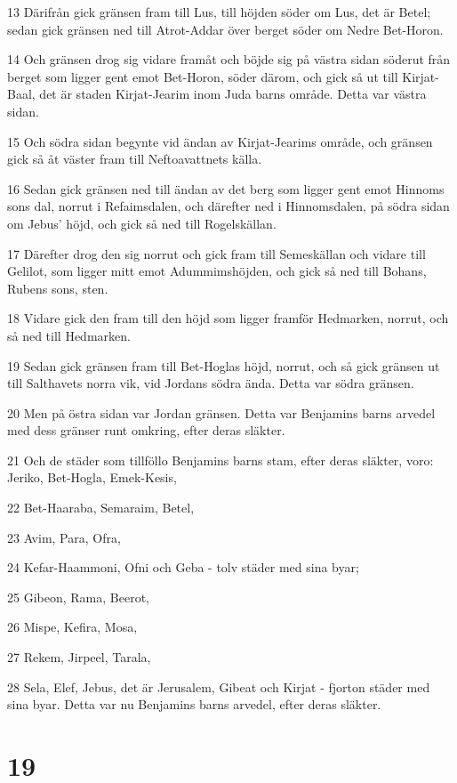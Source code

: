 \par 13 Därifrån gick gränsen fram till Lus, till höjden söder om Lus, det är Betel; sedan gick gränsen ned till Atrot-Addar över berget söder om Nedre Bet-Horon.
\par 14 Och gränsen drog sig vidare framåt och böjde sig på västra sidan söderut från berget som ligger gent emot Bet-Horon, söder därom, och gick så ut till Kirjat-Baal, det är staden Kirjat-Jearim inom Juda barns område. Detta var västra sidan.
\par 15 Och södra sidan begynte vid ändan av Kirjat-Jearims område, och gränsen gick så åt väster fram till Neftoavattnets källa.
\par 16 Sedan gick gränsen ned till ändan av det berg som ligger gent emot Hinnoms sons dal, norrut i Refaimsdalen, och därefter ned i Hinnomsdalen, på södra sidan om Jebus' höjd, och gick så ned till Rogelskällan.
\par 17 Därefter drog den sig norrut och gick fram till Semeskällan och vidare till Gelilot, som ligger mitt emot Adummimshöjden, och gick så ned till Bohans, Rubens sons, sten.
\par 18 Vidare gick den fram till den höjd som ligger framför Hedmarken, norrut, och så ned till Hedmarken.
\par 19 Sedan gick gränsen fram till Bet-Hoglas höjd, norrut, och så gick gränsen ut till Salthavets norra vik, vid Jordans södra ända. Detta var södra gränsen.
\par 20 Men på östra sidan var Jordan gränsen. Detta var Benjamins barns arvedel med dess gränser runt omkring, efter deras släkter.
\par 21 Och de städer som tillföllo Benjamins barns stam, efter deras släkter, voro: Jeriko, Bet-Hogla, Emek-Kesis,
\par 22 Bet-Haaraba, Semaraim, Betel,
\par 23 Avim, Para, Ofra,
\par 24 Kefar-Haammoni, Ofni och Geba - tolv städer med sina byar;
\par 25 Gibeon, Rama, Beerot,
\par 26 Mispe, Kefira, Mosa,
\par 27 Rekem, Jirpeel, Tarala,
\par 28 Sela, Elef, Jebus, det är Jerusalem, Gibeat och Kirjat - fjorton städer med sina byar. Detta var nu Benjamins barns arvedel, efter deras släkter.

\chapter{19}

